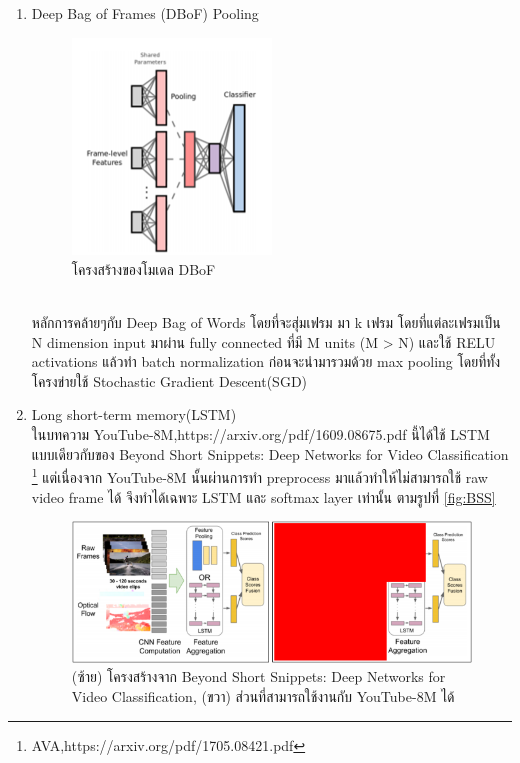 \begin{enumerate}
\begin{enumerate}
		\item Deep Bag of Frames (DBoF) Pooling
		\begin{figure}[!ht]
			\centering
			\includegraphics[width=0.5\textwidth]{chapter2/images/DBoF.png}
				\caption{โครงสร้างของโมเดล DBoF}
    			\label{fig:DBoF}
		\end{figure}
		\\ หลักการคล้ายๆกับ Deep Bag of Words โดยที่จะสุ่มเฟรม มา k เฟรม โดยที่แต่ละเฟรมเป็น N dimension input มาผ่าน fully connected ที่มี M units (M > N) และใช้ RELU activations แล้วทำ batch normalization ก่อนจะนำมารวมด้วย max pooling โดยที่ทั้งโครงข่ายใช้ Stochastic  Gradient Descent(SGD) 
		\clearpage
		\item Long short-term memory(LSTM)
		\\ ในบทความ {YouTube-8M,https://arxiv.org/pdf/1609.08675.pdf} นี้ได้ใช้ LSTM แบบเดียวกับของ Beyond Short Snippets: Deep Networks for Video Classification \footnote{AVA,https://arxiv.org/pdf/1705.08421.pdf} แต่เนื่องจาก YouTube-8M นั้นผ่านการทำ preprocess มาแล้วทำให้ไม่สามารถใช้ raw video frame ได้ จึงทำได้เฉพาะ LSTM และ softmax layer เท่านั้น ตามรูปที่ \ref{fig:BSS}
		\begin{figure}[!ht]
			\centering
			\includegraphics[width=1\textwidth]{chapter2/images/BSS.png}
			\caption{(ซ้าย) โครงสร้างจาก Beyond Short Snippets: Deep Networks for Video Classification, (ขวา) ส่วนที่สามารถใช้งานกับ YouTube-8M ได้}

\end{figure}
\end{enumerate}
\end{enumerate}
